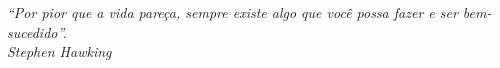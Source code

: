 \begin{epigrafe}
    \vspace*{\fill}
	\begin{flushright}
		\textit{``Por pior que a vida pareça, sempre existe algo que você possa fazer e ser bem-sucedido''.\\
		Stephen Hawking}
	\end{flushright}
\end{epigrafe}